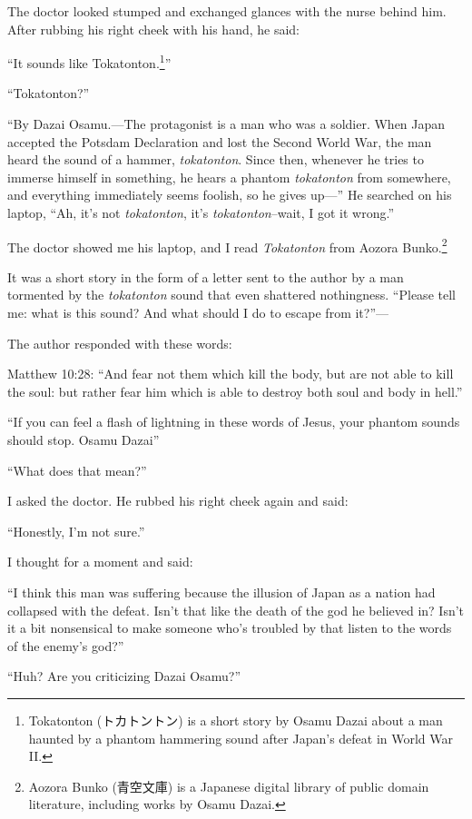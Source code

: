 \documentclass[
    a4paper,
    12pt,
    twoside,
    openany,
    UTF8,
    fontset=windows
]{ctexbook}
\begin{document}
The doctor looked stumped and exchanged glances with the nurse behind him. After rubbing his right cheek with his hand, he said:

``It sounds like Tokatonton.\footnote{Tokatonton (トカトントン) is a short story by Osamu Dazai about a man haunted by a phantom hammering sound after Japan's defeat in World War II.}''

``Tokatonton?''

``By Dazai Osamu.---The protagonist is a man who was a soldier. When Japan accepted the Potsdam Declaration and lost the Second World War, the man heard the sound of a hammer, \textit{tokatonton}. Since then, whenever he tries to immerse himself in something, he hears a phantom \textit{tokatonton} from somewhere, and everything immediately seems foolish, so he gives up---'' He searched on his laptop, ``Ah, it's not \textit{tokatonton}, it's \textit{tokatonton}--wait, I got it wrong.''

The doctor showed me his laptop, and I read \textit{Tokatonton} from Aozora Bunko.\footnote{Aozora Bunko (青空文庫) is a Japanese digital library of public domain literature, including works by Osamu Dazai.}

It was a short story in the form of a letter sent to the author by a man tormented by the \textit{tokatonton} sound that even shattered nothingness. ``Please tell me: what is this sound? And what should I do to escape from it?''---

The author responded with these words:

Matthew 10:28: ``And fear not them which kill the body, but are not able to kill the soul: but rather fear him which is able to destroy both soul and body in hell.''

``If you can feel a flash of lightning in these words of Jesus, your phantom sounds should stop. \hfill Osamu Dazai''

``What does that mean?''

I asked the doctor. He rubbed his right cheek again and said:

``Honestly, I'm not sure.''

I thought for a moment and said:

``I think this man was suffering because the illusion of Japan as a nation had collapsed with the defeat. Isn't that like the death of the god he believed in? Isn't it a bit nonsensical to make someone who's troubled by that listen to the words of the enemy's god?''

``Huh? Are you criticizing Dazai Osamu?''
\end{document}
